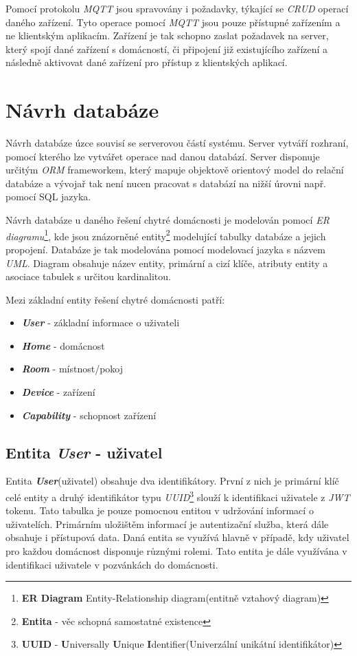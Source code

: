 Pomocí protokolu \emph{MQTT} jsou spravovány i požadavky, týkající se \emph{CRUD} operací daného zařízení. Tyto operace pomocí \emph{MQTT} jsou pouze přístupné zařízením a ne klientským aplikacím.
Zařízení je tak schopno zaslat požadavek na server, který spojí dané zařízení s domácností, či připojení již existujícího zařízení a následně aktivovat dané zařízení pro přístup z klientských aplikací.

\newpage
\section{Návrh databáze}
\label{navrh:databaze}

Návrh databáze úzce souvisí se serverovou částí systému. Server vytváří rozhraní, pomocí kterého lze vytvářet operace nad danou databází.
Server disponuje určitým \emph{ORM} frameworkem, který mapuje objektově orientový model do relační databáze a vývojař tak není nucen pracovat s databází na nižší úrovni např. pomocí SQL jazyka.

Návrh databáze u daného řešení chytré domácnosti je modelován pomocí \emph{ER diagramu}\footnote{\textbf{ER Diagram} Entity-Relationship diagram(entitně vztahový diagram)}, kde jsou znázorněné entity\footnote{\textbf{Entita} - věc schopná samostatné existence} modelující tabulky databáze a jejich propojení.
Databáze je tak modelována pomocí modelovací jazyka s názvem \emph{UML}. Diagram obsahuje název entity, primární a cizí klíče, atributy entity a asociace tabulek s určitou kardinalitou.

Mezi základní entity řešení chytré domácnosti patří:
\begin{itemize}
  \item \textbf{\emph{User}} - základní informace o uživateli
  \item \textbf{\emph{Home}} - domácnost
  \item \textbf{\emph{Room}} - místnost/pokoj
  \item \textbf{\emph{Device}} - zařízení
  \item \textbf{\emph{Capability}} - schopnost zařízení
\end{itemize}

\subsection*{Entita \emph{User} - uživatel}
\label{databaze:user}
Entita \textbf{\emph{User}}(uživatel) obsahuje dva identifikátory. První z nich je primární klíč celé entity a druhý identifikátor typu \emph{UUID}\footnote{\textbf{UUID} - \textbf{U}niversally \textbf{U}nique \textbf{I}dentifier(Univerzální unikátní identifikátor)} slouží k identifikaci uživatele z \emph{JWT} tokenu.
Tato tabulka je pouze pomocnou entitou v udržování informací o uživatelích. Primárním uložištěm informací je autentizační služba, která dále obsahuje i přístupová data.
Daná entita se využívá hlavně v případě, kdy uživatel pro každou domácnost disponuje různými rolemi. Tato entita je dále využívána v identifikaci uživatele v pozvánkách do domácnosti.

